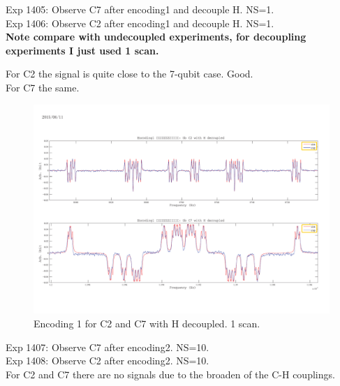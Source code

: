 \clearpage
Exp 1405: Observe C7 after encoding1 and decouple H. NS=1.\\
Exp 1406: Observe C2 after encoding1 and decouple H. NS=1.\\
\textbf{Note compare with undecoupled experiments, for decoupling experiments I just used 1 scan.}

For C2 the signal is quite close to the 7-qubit case. Good.\\
For C7 the same.

\begin{figure}[htb]
\begin{center}
\includegraphics[width=\columnwidth]{Encoding1_with_decouple.pdf}
\end{center}
\setlength{\abovecaptionskip}{-0.35cm}
\caption{\footnotesize{Encoding 1 for C2 and C7 with H decoupled. 1 scan.}}\label{1405and1406}
\end{figure}

\clearpage
Exp 1407: Observe C7 after encoding2. NS=10.\\
Exp 1408: Observe C2 after encoding2. NS=10.\\

For C2 and C7 there are no signals due to the broaden of the C-H couplings.

